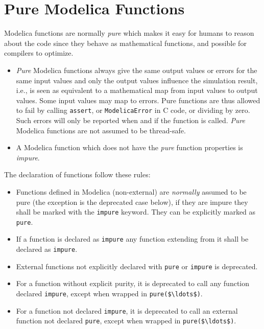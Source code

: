 \section{Pure Modelica Functions}\label{pure-modelica-functions}

Modelica functions are normally \emph{pure} which makes it easy for humans to reason about the code since they behave as mathematical functions, and possible for compilers to optimize.

\begin{itemize}
\item
  \emph{Pure} Modelica functions always give the same output values or errors for the same input values and only the output values influence the simulation result, i.e., is seen as equivalent to a mathematical map from input values to output values.
  Some input values may map to errors.
  Pure functions are thus allowed to fail by calling \lstinline!assert!, or \lstinline[language=C]!ModelicaError! in C code, or dividing by zero.
  Such errors will only be reported when and if the function is called.
  \emph{Pure} Modelica functions are not assumed to be thread-safe.
\item
  A Modelica function which does not have the \emph{pure} function properties is \emph{impure}.
\end{itemize}

The declaration of functions follow these rules:
\begin{itemize}
\item
  Functions defined in Modelica (non-external) are \emph{normally} assumed to be pure (the exception is the deprecated case below), if they are impure they shall be marked with the \lstinline!impure! keyword.
  They can be explicitly marked as \lstinline!pure!.
\item
  If a function is declared as \lstinline!impure! any function extending from it shall be declared as \lstinline!impure!.
\item
  External functions not explicitly declared with \lstinline!pure! or \lstinline!impure! is deprecated.
\item
  For a function without explicit purity, it is deprecated to call any function declared \lstinline!impure!, except when wrapped in \lstinline!pure($\ldots$)!.
\item
  For a function not declared \lstinline!impure!, it is deprecated to call an external function not declared \lstinline!pure!, except when wrapped in \lstinline!pure($\ldots$)!.
\end{itemize}

